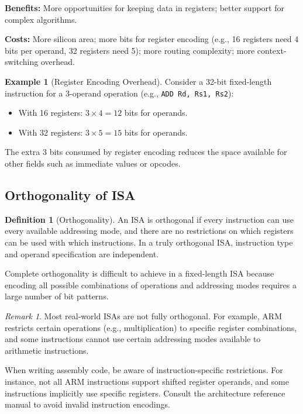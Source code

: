 \documentclass[11pt, a4paper, notitlepage]{report}
\theoremstyle{definition}
\newtheorem{definition}[theorem]{Definition}
\theoremstyle{remark}
\newtheorem{remark}[theorem]{Remark}
\theoremstyle{definition}
\newtheorem{example}[theorem]{Example}
\begin{document}
\textbf{Benefits:} More opportunities for keeping data in registers; better support for complex algorithms.

\textbf{Costs:} More silicon area; more bits for register encoding (e.g., 16 registers need 4 bits per operand, 32 registers need 5); more routing complexity; more context-switching overhead.

\begin{example}[Register Encoding Overhead]
Consider a 32-bit fixed-length instruction for a 3-operand operation (e.g., \texttt{ADD Rd, Rs1, Rs2}):
\begin{itemize}
  \item With 16 registers: $3 \times 4 = 12$ bits for operands.
  \item With 32 registers: $3 \times 5 = 15$ bits for operands.
\end{itemize}
The extra 3 bits consumed by register encoding reduces the space available for other fields such as immediate values or opcodes.
\end{example}

\subsection{Orthogonality of ISA}

\begin{definition}[Orthogonality]
\label{def:orthogonality}
An ISA is orthogonal if every instruction can use every available addressing mode, and there are no restrictions on which registers can be used with which instructions. In a truly orthogonal ISA, instruction type and operand specification are independent.
\end{definition}

Complete orthogonality is difficult to achieve in a fixed-length ISA because encoding all possible combinations of operations and addressing modes requires a large number of bit patterns.

\begin{remark}
Most real-world ISAs are not fully orthogonal. For example, ARM restricts certain operations (e.g., multiplication) to specific register combinations, and some instructions cannot use certain addressing modes available to arithmetic instructions.
\end{remark}

\begin{warning}[title={Non-Orthogonal Restrictions}]
When writing assembly code, be aware of instruction-specific restrictions. For instance, not all ARM instructions support shifted register operands, and some instructions implicitly use specific registers. Consult the architecture reference manual to avoid invalid instruction encodings.
\end{warning}
\end{document}
